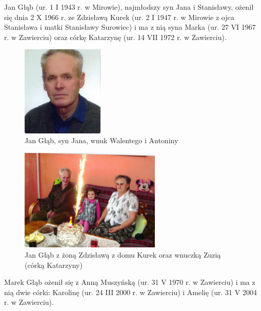 Jan Głąb (ur. 1 I 1943 r. w Mirowie), najmłodszy syn Jana i Stanisławy, ożenił się dnia 2 X 1966 r. ze Zdzisławą Kurek (ur. 2 I 1947 r. w Mirowie z ojca Stanisława i matki Stanisławy Surowiec) i ma z nią syna Marka (ur. 27 VI 1967 r. w Zawierciu) oraz córkę Katarzynę (ur. 14 VII 1972 r. w Zawierciu).

\begin{figure}[!h]
\begin{center}
\includegraphics[width=0.35\textwidth]{zdjecia/jan_glab_junior.jpg}
\caption[Jan Głąb]{Jan Głąb, syn Jana, wnuk Walentego i Antoniny}
\label{rys:jan_glab_junior}
\end{center}
\end{figure}

\begin{figure}[!h]
\begin{center}
\includegraphics[width=0.6\textwidth]{zdjecia/jan_i_zdzislawa_glabowie.jpg}
\caption[Jan Głąb z żoną Zdzisławą z domu Kurek oraz wnuczką Zuzią]{Jan Głąb z żoną Zdzisławą z domu Kurek oraz wnuczką Zuzią (córką Katarzyny)}
\label{rys:jan_i_zdzislawa_glabowie}
\end{center}
\end{figure}

Marek Głąb ożenił się z Anną Muszyńską (ur. 31 V 1970 r. w Zawierciu) i ma z nią dwie córki: Karolinę (ur. 24 III 2000 r. w Zawierciu) i Amelię (ur. 31 V 2004 r. w Zawierciu).

